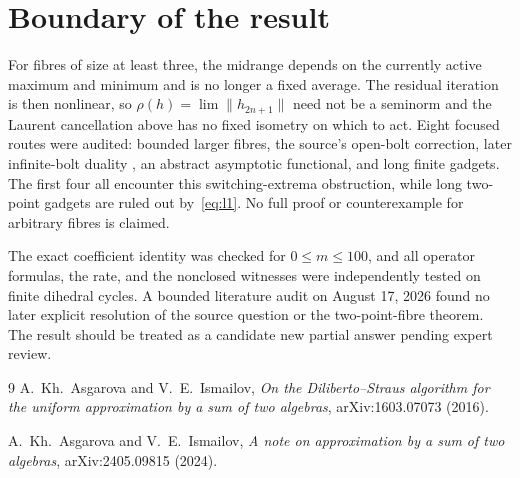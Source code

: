 \documentclass[11pt]{article}
\theoremstyle{remark}
\begin{document}
\section{Boundary of the result}

For fibres of size at least three, the midrange depends on the currently
active maximum and minimum and is no longer a fixed average.  The residual
iteration is then nonlinear, so $\rho(h)=\lim\|h_{2n+1}\|$ need not be a
seminorm and the Laurent cancellation above has no fixed isometry on which
to act.  Eight focused routes were audited: bounded larger fibres, the
source's open-bolt correction, later infinite-bolt duality \cite{AI2}, an
abstract asymptotic functional, and long finite gadgets.  The first four
all encounter this switching-extrema obstruction, while long two-point
gadgets are ruled out by~\eqref{eq:l1}.  No full proof or counterexample for
arbitrary fibres is claimed.

The exact coefficient identity was checked for $0\le m\le100$, and all
operator formulas, the rate, and the nonclosed witnesses were independently
tested on finite dihedral cycles.  A bounded literature audit on August 17,
2026 found no later explicit resolution of the source question or the
two-point-fibre theorem.  The result should be treated as a candidate new
partial answer pending expert review.

\begin{thebibliography}{9}
A.~Kh.~Asgarova and V.~E.~Ismailov,
\emph{On the Diliberto--Straus algorithm for the uniform approximation by a
sum of two algebras}, arXiv:1603.07073 (2016).

A.~Kh.~Asgarova and V.~E.~Ismailov,
\emph{A note on approximation by a sum of two algebras},
arXiv:2405.09815 (2024).
\end{thebibliography}
\end{document}
